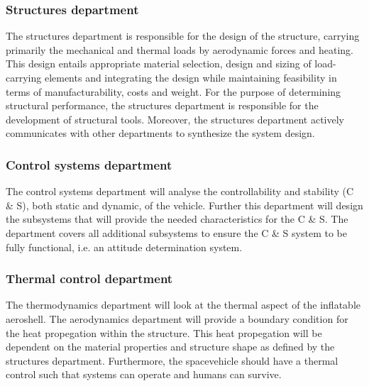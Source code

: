 \subsubsection{Structures department}\label{subsec:struct}
The structures department is responsible for the design of the structure, carrying primarily the mechanical and thermal loads by aerodynamic forces and heating. This design entails appropriate material selection, design and sizing of load-carrying elements and integrating the design while maintaining feasibility in terms of manufacturability, costs and weight. For the purpose of determining structural performance, the structures department is responsible for the development of structural tools. Moreover, the structures department actively communicates with other departments to synthesize the system design.

\subsubsection{Control systems department}\label{subsec:control}
The control systems department will analyse the controllability and stability (C \& S), both static and dynamic, of the vehicle. Further this department will design the subsystems that will provide the needed characteristics for the C \& S. The department covers all additional subsystems to ensure the C \& S system to be fully functional, i.e. an attitude determination system.


\subsubsection{Thermal control department}\label{subsec:therm}
The thermodynamics department will look at the thermal aspect of the inflatable aeroshell. The aerodynamics department will provide a boundary condition for the heat propegation within the structure. This heat propegation will be dependent on the material properties and structure shape as defined by the structures department. Furthermore, the spacevehicle should have a thermal control such that systems can operate and humans can survive.